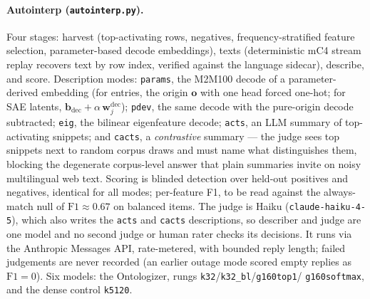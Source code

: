 \paragraph{Autointerp (\texttt{autointerp.py}).}
Four stages: harvest (top-activating rows, negatives, frequency-stratified
feature selection, parameter-based decode embeddings), texts
(deterministic mC4 stream replay recovers text by row index, verified
against the language sidecar), describe, and score. Description modes:
\texttt{params}, the M2M100 decode of a parameter-derived embedding (for
entries, the origin $\mathbf{o}$ with one head forced
one-hot; for SAE latents, $\mathbf{b}_{\mathrm{dec}} +
\alpha\,\mathbf{w}^{\mathrm{dec}}_j$); \texttt{pdev}, the same decode
with the pure-origin decode subtracted; \texttt{eig}, the bilinear
eigenfeature decode; \texttt{acts}, an LLM summary of top-activating
snippets; and \texttt{cacts}, a \emph{contrastive} summary --- the judge
sees top snippets next to random corpus draws and must name what
distinguishes them, blocking the degenerate corpus-level answer that
plain summaries invite on noisy multilingual web text. Scoring is blinded
detection over held-out positives and negatives, identical for all
modes; per-feature F1, to be read against the always-match null of
$\mathrm{F1} \approx 0.67$ on balanced items. The judge is Haiku
(\texttt{claude-haiku-4-5}), which also writes the \texttt{acts} and
\texttt{cacts} descriptions, so describer and judge are one model and no
second judge or human rater checks its decisions. It runs via the
Anthropic Messages API, rate-metered,
with bounded reply length; failed judgements are never recorded (an
earlier outage mode scored empty replies as $\mathrm{F1}=0$). Six models:
the Ontologizer, rungs \texttt{k32}/\texttt{k32\_bl}/\texttt{g160top1}/%
\texttt{g160softmax}, and the dense control \texttt{k5120}.

